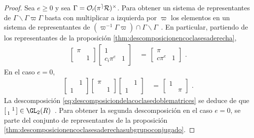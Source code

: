 \begin{proof}
	Sea $e\geq 0$ y sea $\Gamma=\cal{O}_{0}(\pi^{e}R)^{\times}$. Para
	obtener un sistema de representantes de
	\begin{math}
		\Gamma\backslash\Gamma\varpi\Gamma
	\end{math}
	basta con multiplicar a izquierda por $\varpi$ los elementos en un
	sistema de representantes de
	\begin{math}
		(\varpi^{-1}\Gamma\varpi)\cap\Gamma\backslash\Gamma
	\end{math}~.
	En particular, partiendo de los representantes de la proposici\'{o}n
	\ref{thm:descomposicionencoclasesaderecha},
	\begin{align*}
		\begin{bmatrix} \pi & \\ & 1 \end{bmatrix}
			\begin{bmatrix} 1 & \\ c_{i}\pi^{e} & 1 \end{bmatrix}
		& \,=\,\begin{bmatrix} \pi & \\ c\pi^{e} & 1 \end{bmatrix}
		\text{ .}
	\end{align*}
	En el caso $e=0$,
	\begin{align*}
		\begin{bmatrix} & 1 \\ 1 & \end{bmatrix}
			\begin{bmatrix} \pi & \\ & 1 \end{bmatrix}
		\begin{bmatrix} & 1 \\ 1 & \end{bmatrix} & \,=\,
			\begin{bmatrix} 1 & \\ & \pi \end{bmatrix}
		\text{ .}
	\end{align*}
	La descomposici\'{o}n \eqref{eq:descomposiciondelacoclasedoblematrices}
	se deduce de que
	\begin{math}
		\left[\begin{smallmatrix} & 1 \\ 1 & \end{smallmatrix}\right]
			\in\GL_{2}(R)
	\end{math}~.
	Para obtener la segunda descomposici\'{o}n en el caso $e=0$, se parte
	del conjunto de representantes de la proposici\'{o}n
	\ref{thm:descomposicionencoclasesaderechasubgrupoconjugado}.
\end{proof}

